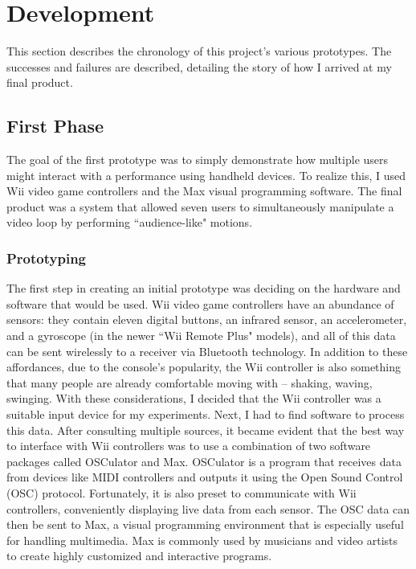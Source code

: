 \chapter{Development}

This section describes the chronology of this project's various prototypes. The successes and failures are described, detailing the story of how I arrived at my final product.

\section{First Phase}

The goal of the first prototype was to simply demonstrate how multiple users might interact with a performance using handheld devices. To realize this, I used Wii video game controllers and the Max visual programming software. The final product was a system that allowed seven users to simultaneously manipulate a video loop by performing ``audience-like" motions.


\subsection{Prototyping}

The first step in creating an initial prototype was deciding on the hardware and software that would be used. Wii video game controllers have an abundance of sensors: they contain eleven digital buttons, an infrared sensor, an accelerometer, and a gyroscope (in the newer ``Wii Remote Plus" models), and all of this data can be sent wirelessly to a receiver via Bluetooth technology. In addition to these affordances, due to the console's popularity, the Wii controller is also something that many people are already comfortable moving with -- shaking, waving, swinging. With these considerations, I decided that the Wii controller was a suitable input device for my experiments. Next, I had to find software to process this data. After consulting multiple sources, it became evident that the best way to interface with Wii controllers was to use a combination of two software packages called OSCulator and Max. OSCulator is a program that receives data from devices like MIDI controllers and outputs it using the Open Sound Control (OSC) protocol. Fortunately, it is also preset to communicate with Wii controllers, conveniently displaying live data from each sensor. The OSC data can then be sent to Max, a visual programming environment that is especially useful for handling multimedia. Max is commonly used by musicians and video artists to create highly customized and interactive programs.

